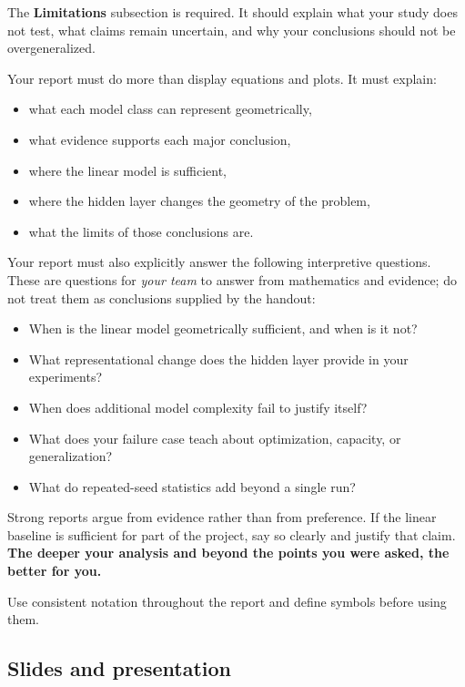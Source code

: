 \documentclass[11pt]{article}
\begin{document}
The \textbf{Limitations} subsection is required. It should explain what your study does not test, what claims remain uncertain, and why your conclusions should not be overgeneralized.

Your report must do more than display equations and plots. It must explain:

\begin{itemize}
    \item what each model class can represent geometrically,
    \item what evidence supports each major conclusion,
    \item where the linear model is sufficient,
    \item where the hidden layer changes the geometry of the problem,
    \item what the limits of those conclusions are.
\end{itemize}

Your report must also explicitly answer the following interpretive questions. These are questions for \emph{your team} to answer from mathematics and evidence; do not treat them as conclusions supplied by the handout:

\begin{itemize}
    \item When is the linear model geometrically sufficient, and when is it not?
    \item What representational change does the hidden layer provide in your experiments?
    \item When does additional model complexity fail to justify itself?
    \item What does your failure case teach about optimization, capacity, or generalization?
    \item What do repeated-seed statistics add beyond a single run?
\end{itemize}

Strong reports argue from evidence rather than from preference. If the linear baseline is sufficient for part of the project, say so clearly and justify that claim. \textbf{The deeper your analysis and beyond the points you were asked, the better for you.}

Use consistent notation throughout the report and define symbols before using them.

\subsection{Slides and presentation}
\end{document}
